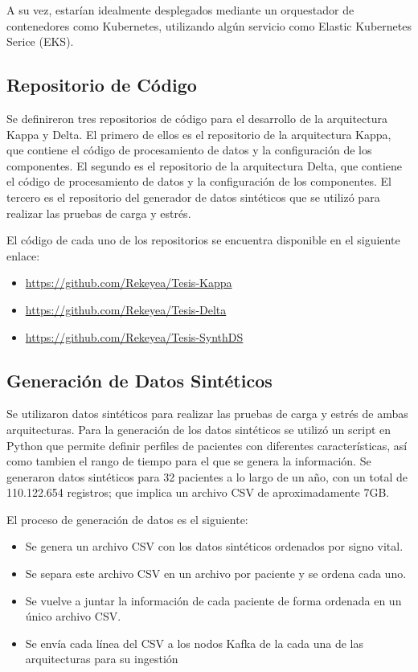 A su vez, estarían idealmente desplegados mediante un orquestador de contenedores como Kubernetes, utilizando algún servicio como Elastic Kubernetes Serice (EKS).


\subsection{Repositorio de Código}

Se definireron tres repositorios de código para el desarrollo de la arquitectura Kappa y Delta.
El primero de ellos es el repositorio de la arquitectura Kappa, que contiene el código de procesamiento de datos y la configuración de los componentes.
El segundo es el repositorio de la arquitectura Delta, que contiene el código de procesamiento de datos y la configuración de los componentes.
El tercero es el repositorio del generador de datos sintéticos que se utilizó para realizar las pruebas de carga y estrés.

El código de cada uno de los repositorios se encuentra disponible en el siguiente enlace:

\begin{itemize}
    \item \url{https://github.com/Rekeyea/Tesis-Kappa}\\
    \item \url{https://github.com/Rekeyea/Tesis-Delta}\\
    \item \url{https://github.com/Rekeyea/Tesis-SynthDS}\\
\end{itemize}

\newpage

\subsection{Generación de Datos Sintéticos}

Se utilizaron datos sintéticos para realizar las pruebas de carga y estrés de ambas arquitecturas.
Para la generación de los datos sintéticos se utilizó un script en Python que permite definir perfiles de pacientes con diferentes características,
así como tambien el rango de tiempo para el que se genera la información.
Se generaron datos sintéticos para 32 pacientes a lo largo de un año, con un total de 110.122.654 registros;
que implica un archivo CSV de aproximadamente 7GB.

El proceso de generación de datos es el siguiente:
\begin{itemize}
    \item Se genera un archivo CSV con los datos sintéticos ordenados por signo vital.
    \item Se separa este archivo CSV en un archivo por paciente y se ordena cada uno.
    \item Se vuelve a juntar la información de cada paciente de forma ordenada en un único archivo CSV.
    \item Se envía cada línea del CSV a los nodos Kafka de la cada una de las arquitecturas para su ingestión
\end{itemize}



